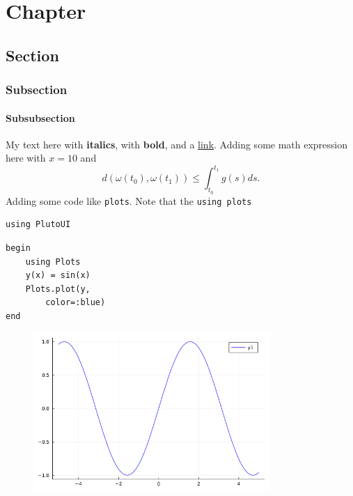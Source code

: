 \newpage

\chapter{Chapter}

\section{Section}

\subsection{Subsection}

\subsubsection{Subsubsection}
My text here with \textbf{italics}, with \textbf{bold}, and a \href{https://davibarreira.github.io/}{link}.  Adding some math expression here with  $x=10$ and 
\begin{displaymath}
	d(\omega(t_0),\omega(t_1)) \leq \int^{t_1}_{t_0}g(s) ds.
\end{displaymath}
 Adding some code like  \lstinline[style=julia]{plots}. Note that the  \lstinline[style=julia]{using plots}  
\begin{lstlisting}[language=JuliaLocal, style=julia]
using PlutoUI
\end{lstlisting}

\begin{lstlisting}[language=JuliaLocal, style=julia]
begin
	using Plots
	y(x) = sin(x)
	Plots.plot(y,
		color=:blue)
end
\end{lstlisting}

\begin{figure}[H]
	\centering
	\includegraphics[width=0.8\textwidth]{./figures/notebooktest_figure1.png}
	\label{fig:notebooktest_figure1.png}

\end{figure}


